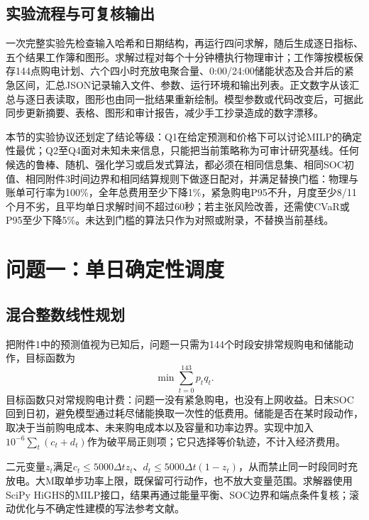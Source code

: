 \documentclass[UTF8,12pt,a4paper]{ctexart}
\begin{document}
\subsection{实验流程与可复核输出}
一次完整实验先检查输入哈希和日期结构，再运行四问求解，随后生成逐日指标、五个结果工作簿和图形。求解过程对每个十分钟槽执行物理审计；工作簿按模板保存144点购电计划、六个四小时充放电聚合量、0:00/24:00储能状态及合并后的紧急区间，汇总JSON记录输入文件、参数、运行环境和输出列表。正文数字从该汇总与逐日表读取，图形也由同一批结果重新绘制。模型参数或代码改变后，可据此同步更新摘要、表格、图形和审计报告，减少手工抄录造成的数字漂移。

本节的实验协议还划定了结论等级：Q1在给定预测和价格下可以讨论MILP的确定性最优；Q2至Q4面对未知未来信息，只能把当前策略称为可审计研究基线。任何候选的鲁棒、随机、强化学习或启发式算法，都必须在相同信息集、相同SOC初值、相同附件3时间边界和相同结算规则下做逐日配对，并满足替换门槛：物理与账单可行率为100\%，全年总费用至少下降1\%，紧急购电P95不升，月度至少8/11个月不劣，且平均单日求解时间不超过60秒；若主张风险改善，还需使CVaR或P95至少下降5\%。未达到门槛的算法只作为对照或附录，不替换当前基线。

\section{问题一：单日确定性调度}
\subsection{混合整数线性规划}
把附件1中的预测值视为已知后，问题一只需为144个时段安排常规购电和储能动作，目标函数为
\begin{equation}\label{eq:q1obj}
\min\sum_{t=0}^{143}p_tq_t .
\end{equation}
目标函数只对常规购电计费：问题一没有紧急购电，也没有上网收益。日末SOC回到日初，避免模型通过耗尽储能换取一次性的低费用。储能是否在某时段动作，取决于当前购电成本、未来购电成本以及容量和功率边界。实现中加入$10^{-6}\sum_t(c_t+d_t)$作为破平局正则项；它只选择等价轨迹，不计入经济费用。

二元变量$z_t$满足$c_t\le5000\Delta t z_t$、$d_t\le5000\Delta t(1-z_t)$，从而禁止同一时段同时充放电。大M取单步功率上限，既保留可行动作，也不放大变量范围。求解器使用SciPy HiGHS的MILP接口，结果再通过能量平衡、SOC边界和端点条件复核；滚动优化与不确定性建模的写法参考文献\cite{gulotta,honen}。
\end{document}
